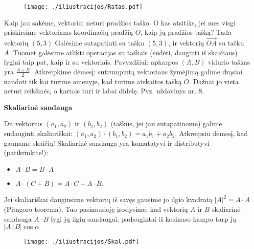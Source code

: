 \begin{figure}[h!]
  \begin{center}
    \texttt{[image: ./iliustracijos/Ratas.pdf]}
  \end{center}
\end{figure}

Kaip jau sakėme, vektoriai neturi pradžios taško. O kas atsitiks, jei mes visgi priskirsime vektoriams koordinačių pradžią $O$, kaip jų pradžios tašką? Tada vektorių $(5,3)$ Galėsime sutapatinti su tašku $(5,3)$, ir vektorių $\vec{OA}$ su tašku $A$. Tuomet galėsime atlikti operacijas su taškais (sudėti, dauginti iš skaičiaus) lygiai taip pat, kaip ir su vektoriais. Pavyzdžiui: apkarpos $(A, B)$ vidurio taškas yra $\frac{A+B}{2}$. Atkreipkime dėmesį: sutrumpintą vektoriaus žymėjimą galime drąsiai naudoti tik kai turime omenyje, kad turime atskaitos tašką $O$. Dažnai jo vieta neturi reikšmės, o kartais turi ir labai didelę. Pvz. uždavinys nr. 8.

\medskip

\begin{center}\textbf{Skaliarinė sandauga}\end{center}

\medskip

Du vektorius $(a_1, a_2)$ ir $(b_1,b_2)$ (taškus, jei jau sutapatinome) galime sudauginti skaliariškai: $(a_1,a_2)\cdot(b_1,b_2) = a_1b_1 + a_2b_2$. Atkreipsiu dėmesį, kad gauname skaičių! 
Skaliarinė sandauga yra komutatyvi ir distributyvi (patikrinkite!): 
\begin{itemize}
\item $A\cdot B = B\cdot A$
\item $A\cdot(C+B) = A\cdot C + A\cdot B$.
\end{itemize}

\smallskip

Jei skaliariškai dauginsime vektorių iš savęs gausime jo ilgio kvadratą $|A|^2 = A\cdot A$ (Pitagoro teorema). Tuo pasinaudoję įrodysime, kad vektorių $A$ ir $B$ skaliarinė sandauga $A\cdot B$ lygi jų ilgių sandaugai, padaugintai iš kosinuso kampo tarp jų $|A||B|\cos{\alpha}$ 

\begin{figure}[h!]
  \begin{center}
    \texttt{[image: ./iliustracijos/Skal.pdf]}
  \end{center}
\end{figure}

